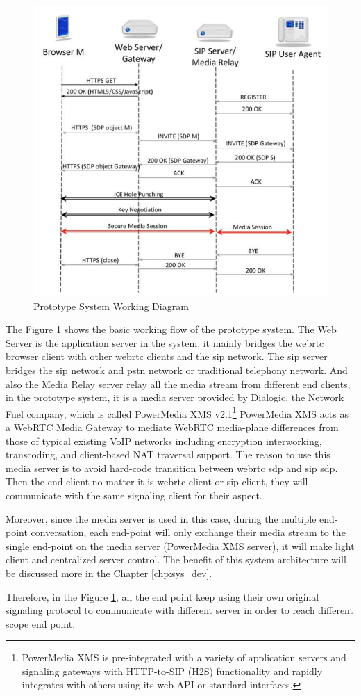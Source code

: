 \begin{figure}
	\centering
    	\includegraphics[width=0.60\textheight,natwidth=610,natheight=642]{figs/system_work_flow.png}
  	\caption{Prototype System Working Diagram \cite{inbook:sys_work_diagram}}
  	\label{fig:sys_work_diagram}
\end{figure}

\par The Figure \ref{fig:sys_work_diagram} shows the basic working flow of the prototype system. The Web Server is the application server in the system, it mainly bridges the \gls{webrtc} browser client with other \gls{webrtc} clients and the \gls{sip} network. The \gls{sip} server bridges the \gls{sip} network and \gls{pstn} network or traditional telephony network. And also the Media Relay server relay all the media stream from different end clients, in the prototype system, it is a media server provided by Dialogic, the Network Fuel company, which is called PowerMedia XMS v2.1\footnote{PowerMedia XMS is pre-integrated with a variety of application servers and signaling gateways with HTTP-to-SIP (H2S) functionality and rapidly integrates with others using its web API or standard interfaces.} PowerMedia XMS acts as a WebRTC Media Gateway to mediate WebRTC media-plane differences from those of typical existing VoIP networks including encryption interworking, transcoding, and client-based NAT traversal support. The reason to use this media server is to avoid hard-code transition between \gls{webrtc} \gls{sdp} and \gls{sip} \gls{sdp}. Then the end client no matter it is \gls{webrtc} client or \gls{sip} client, they will communicate with the same signaling client for their aspect.
\par Moreover, since the media server is used in this case, during the multiple end-point conversation, each end-point will only exchange their media stream to the single end-point on the media server (PowerMedia XMS server), it will make light client and centralized server control. The benefit of this system architecture will be discussed more in the Chapter \ref{chp:sys_dev}.

\par Therefore, in the Figure \ref{fig:sys_work_diagram}, all the end point keep using their own original signaling protocol to communicate with different server in order to reach different scope end point.